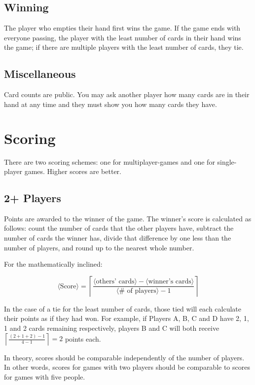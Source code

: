 \documentclass{article}
\begin{document}
\subsection{Winning}

The player who empties their hand first wins the game. If the game ends with everyone passing, the player with the least number of cards in their hand wins the game; if there are multiple players with the least number of cards, they tie.

\subsection{Miscellaneous}

Card counts are public. You may ask another player how many cards are in their hand at any time and they must show you how many cards they have.

\pagebreak
\section{Scoring}

There are two scoring schemes: one for multiplayer-games and one for single-player games. Higher scores are better.

\subsection{2+ Players}

Points are awarded to the winner of the game. The winner's score is calculated as follows: count the number of cards that the other players have, subtract the number of cards the winner has, divide that difference by one less than the number of players, and round up to the nearest whole number.

For the mathematically inclined:

$$
\langle\textrm{Score}\rangle = \left\lceil\frac{\langle\textrm{others'\ cards}\rangle - \langle\textrm{winner's\ cards}\rangle}{\langle\textrm{\#\ of\ players}\rangle - 1}\right\rceil
$$

In the case of a tie for the least number of cards, those tied will each calculate their points as if they had won. For example, if Players A, B, C and D have 2, 1, 1 and 2 cards remaining respectively, players B and C will both receive $\left\lceil\frac{(2+1+2) - 1}{4 - 1}\right\rceil = 2$ points each.

In theory, scores should be comparable independently of the number of players. In other words, scores for games with two players should be comparable to scores for games with five people.
\end{document}
